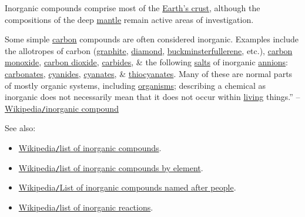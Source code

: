 \documentclass{article}
\begin{document}
Inorganic compounds comprise most of the \href{https://en.wikipedia.org/wiki/Earth%27s_crust}{Earth's crust}, although the compositions of the deep \href{https://en.wikipedia.org/wiki/Mantle_(geology)}{mantle} remain active areas of investigation.

Some simple \href{https://en.wikipedia.org/wiki/Carbon}{carbon} compounds are often considered inorganic. Examples include the allotropes of carbon (\href{https://en.wikipedia.org/wiki/Graphite}{graphite}, \href{https://en.wikipedia.org/wiki/Diamond}{diamond}, \href{https://en.wikipedia.org/wiki/Buckminsterfullerene}{buckminsterfullerene}, etc.), \href{https://en.wikipedia.org/wiki/Carbon_monoxide}{carbon monoxide}, \href{https://en.wikipedia.org/wiki/Carbon_dioxide}{carbon dioxide}, \href{https://en.wikipedia.org/wiki/Carbide}{carbides}, \& the following \href{https://en.wikipedia.org/wiki/Salt_(chemistry)}{salts} of inorganic \href{https://en.wikipedia.org/wiki/Anion}{annions}: \href{https://en.wikipedia.org/wiki/Carbonate}{carbonates}, \href{https://en.wikipedia.org/wiki/Cyanide}{cyanides}, \href{https://en.wikipedia.org/wiki/Cyanate}{cyanates}, \& \href{https://en.wikipedia.org/wiki/Thiocyanate}{thiocyanates}. Many of these are normal parts of mostly organic systems, including \href{https://en.wikipedia.org/wiki/Organism}{organisms}; describing a chemical as inorganic does not necessarily mean that it does not occur within \href{https://en.wikipedia.org/wiki/Life}{living} things.'' -- \href{https://en.wikipedia.org/wiki/Inorganic_compound}{Wikipedia\texttt{/}inorganic compound}

See also:
\begin{itemize}
	\item \href{https://en.wikipedia.org/wiki/List_of_inorganic_compounds}{Wikipedia\texttt{/}list of inorganic compounds}.
	\item \href{https://en.wikipedia.org/wiki/Inorganic_compounds_by_element}{Wikipedia\texttt{/}list of inorganic compounds by element}.
	\item \href{https://en.wikipedia.org/wiki/List_of_inorganic_compounds_named_after_people}{Wikipedia\texttt{/}List of inorganic compounds named after people}.
	\item \href{https://en.wikipedia.org/wiki/List_of_inorganic_reactions}{Wikipedia\texttt{/}list of inorganic reactions}.
\end{itemize}

\end{document}
